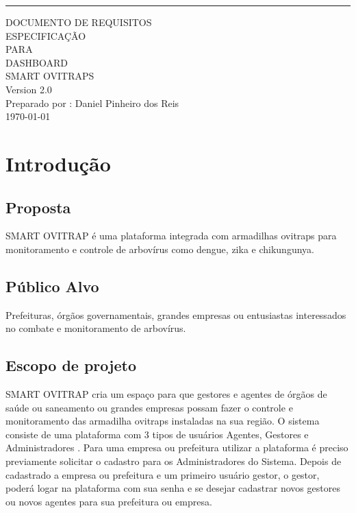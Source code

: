 \documentclass{scrreprt}
\date{}
\def\myversion{2.0 }
\begin{document}
	
	\begin{flushright}
		\rule{10cm}{5pt}\vskip1cm
		\begin{bfseries}
			\Huge{DOCUMENTO DE REQUISITOS\\ESPECIFICAÇÃO}\\
			\vspace{1.5cm}
			PARA\\
			\vspace{1.5cm}
			DASHBOARD\\ SMART OVITRAPS\\
			\vspace{1.5cm}
			\LARGE{Version \myversion}\\
			\vspace{1.5cm}
			Preparado por : Daniel Pinheiro dos Reis\\
			\vspace{1.5cm}
			\today\\
		\end{bfseries}
	\end{flushright}
		
	\chapter{Introdução}
	
	\section{Proposta}
	SMART OVITRAP é uma plataforma integrada com armadilhas ovitraps para monitoramento e controle de arbovírus como dengue, zika e chikungunya. 
	
	\section{Público Alvo}
	Prefeituras, órgãos governamentais, grandes empresas ou entusiastas interessados no combate e monitoramento de arbovírus.
	\section{Escopo de projeto}
	SMART OVITRAP cria um espaço para que gestores e agentes de órgãos de saúde ou saneamento ou grandes empresas possam fazer o controle e monitoramento das armadilha ovitraps instaladas na sua região.
	\newline
	O sistema consiste de uma plataforma com 3 tipos de usuários Agentes, Gestores e Administradores .
	Para uma empresa ou prefeitura utilizar a plataforma é preciso previamente solicitar o cadastro para os Administradores do Sistema. Depois de cadastrado a empresa ou prefeitura e um primeiro usuário gestor, o gestor, poderá logar na plataforma com sua senha e se desejar cadastrar novos gestores ou novos agentes para sua prefeitura ou empresa. 
	
\end{document}
